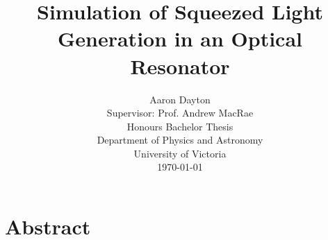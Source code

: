 \documentclass[aps,pra,showpacs,amsmath,amssymb,nofootinbib,longbibliography,superscriptaddress
]{revtex4-1}
\theoremstyle{definition}
\theoremstyle{remark}
\newcommand{\0}{\hat{0}}
\begin{document}

\title{\LARGE Simulation of Squeezed Light Generation in an Optical Resonator}
\author{\Large \vspace{2.5cm}Aaron Dayton\\\vspace{3pt} Supervisor: Prof. Andrew MacRae\\\vspace{10cm}Honours Bachelor Thesis\\\vspace{3pt}Department of Physics and Astronomy\\\vspace{3pt}University of Victoria\\\vspace{5pt}\today} 

\vspace*{2cm} 
\maketitle


\begingroup
\titleformat{\section}[block]{\Large\bfseries\filcenter}{}{0em}{}
\section*{Abstract}
\endgroup
\end{document}
